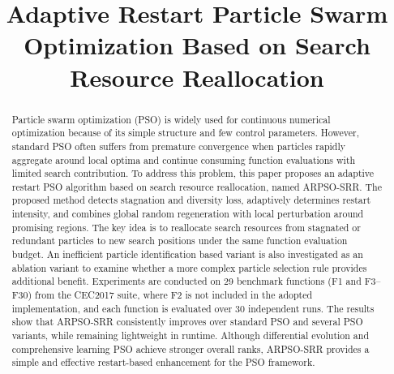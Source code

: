 \documentclass[conference]{IEEEtran}
\begin{document}
\title{Adaptive Restart Particle Swarm Optimization Based on Search Resource Reallocation}

\author{
    \and
}

\maketitle

\begin{abstract}
Particle swarm optimization (PSO) is widely used for continuous numerical optimization because of its simple structure and few control parameters. However, standard PSO often suffers from premature convergence when particles rapidly aggregate around local optima and continue consuming function evaluations with limited search contribution. To address this problem, this paper proposes an adaptive restart PSO algorithm based on search resource reallocation, named ARPSO-SRR. The proposed method detects stagnation and diversity loss, adaptively determines restart intensity, and combines global random regeneration with local perturbation around promising regions. The key idea is to reallocate search resources from stagnated or redundant particles to new search positions under the same function evaluation budget. An inefficient particle identification based variant is also investigated as an ablation variant to examine whether a more complex particle selection rule provides additional benefit. Experiments are conducted on 29 benchmark functions (F1 and F3--F30) from the CEC2017 suite, where F2 is not included in the adopted implementation, and each function is evaluated over 30 independent runs. The results show that ARPSO-SRR consistently improves over standard PSO and several PSO variants, while remaining lightweight in runtime. Although differential evolution and comprehensive learning PSO achieve stronger overall ranks, ARPSO-SRR provides a simple and effective restart-based enhancement for the PSO framework.
\end{abstract}
\end{document}
